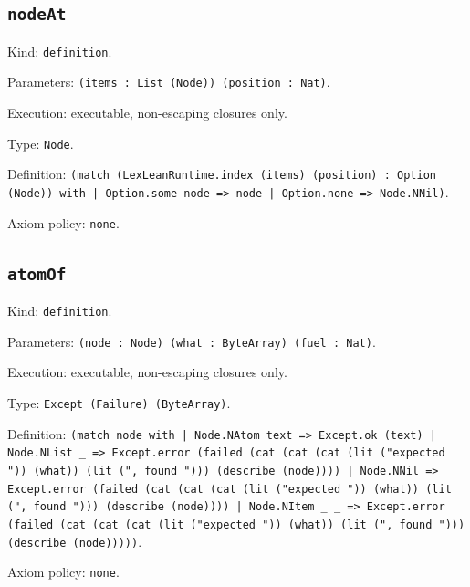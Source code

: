 \documentclass[11pt]{article}
\begin{document}
\subsection*{\texttt{nodeAt}}
\noindent Kind: \texttt{definition}.\par
\noindent Parameters: \texttt{(items : List (Node)) (position : Nat)}.\par
\noindent Execution: executable, non-escaping closures only.\par
\noindent Type: \texttt{Node}.\par
\noindent Definition: \texttt{(match (LexLeanRuntime.index (items) (position) : Option (Node)) with | Option.some node => node | Option.none => Node.NNil)}.\par
\noindent Axiom policy: \texttt{none}.\par
\subsection*{\texttt{atomOf}}
\noindent Kind: \texttt{definition}.\par
\noindent Parameters: \texttt{(node : Node) (what : ByteArray) (fuel : Nat)}.\par
\noindent Execution: executable, non-escaping closures only.\par
\noindent Type: \texttt{Except (Failure) (ByteArray)}.\par
\noindent Definition: \texttt{(match node with | Node.NAtom text => Except.ok (text) | Node.NList \_ => Except.error (failed (cat (cat (cat (lit ("expected ")) (what)) (lit (", found "))) (describe (node)))) | Node.NNil => Except.error (failed (cat (cat (cat (lit ("expected ")) (what)) (lit (", found "))) (describe (node)))) | Node.NItem \_ \_ => Except.error (failed (cat (cat (cat (lit ("expected ")) (what)) (lit (", found "))) (describe (node)))))}.\par
\noindent Axiom policy: \texttt{none}.\par
\end{document}
